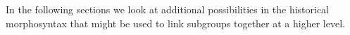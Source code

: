 In the following sections we look at additional possibilities
in the historical morphosyntax that might be used to link subgroups
together at a higher level.